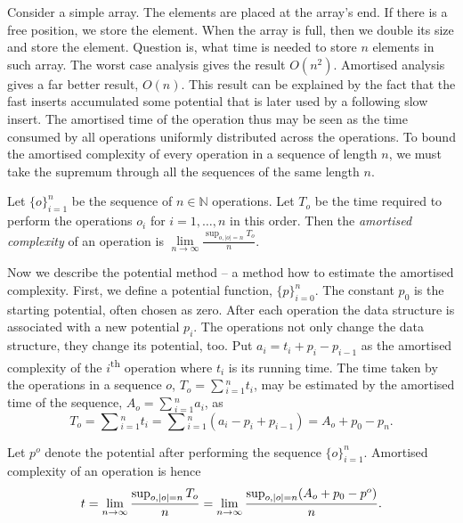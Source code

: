 Consider a simple array. The elements are placed at the array's end. If there is a free position, we store the element. When the array is full, then we double its size and store the element. Question is, what time is needed to store $n$ elements in such array. The worst case analysis gives the result $O(n ^ 2)$. Amortised analysis gives a far better result, $O(n)$. This result can be explained by the fact that the fast inserts accumulated some potential that is later used by a following slow insert. The amortised time of the operation thus may be seen as the time consumed by all operations uniformly distributed across the operations. To bound the amortised complexity of every operation in a sequence of length $n$, we must take the supremum through all the sequences of the same length $n$.
\begin{definition}
Let $\{o\}_{i = 1}^{n}$ be the sequence of $n \in \mathbb{N}$ operations. Let $T_o$ be the time required to perform the operations $o_i$ for $i = 1, \dots, n$ in this order. Then the \emph{amortised complexity} of an operation is $\lim\limits_{n \rightarrow \infty}\frac{\sup_{o, |o| = n}T_o}{n}$.
\end{definition}

Now we describe the potential method -- a method how to estimate the amortised complexity. First, we define a potential function, $\{p\}_{i = 0}^{n}$. The constant $p_0$ is the starting potential, often chosen as zero. After each operation the data structure is associated with a new potential $p_i$. The operations not only change the data structure, they change its potential, too. Put $a_i = t_i + p_{i} - p_{i - 1}$ as the amortised complexity of the $i$\textsuperscript{th} operation where $t_i$ is its running time. The time taken by the operations in a sequence $o$, $T_o = \sum\displaystyle_{i = 1}^{n} t_i$, may be estimated by the amortised time of the sequence, $A_o = \sum\displaystyle_{i = 1}^{n} a_i$, as
\[
	T_o = \sum\displaystyle_{i = 1}^{n} t_i = \sum\displaystyle_{i = 1}^{n} (a_i - p_i + p_{i - 1}) = A_o + p_0 - p_n \text{.}
\]

Let $p^o$ denote the potential after performing the sequence $\{o\}_{i = 1}^{n}$. Amortised complexity of an operation is hence
\[
	t = \lim\limits_{n \rightarrow \infty} \frac{\sup\displaylimits_{o, |o| = n} T_o}{n} = \lim\limits_{n \rightarrow \infty} \frac{\sup\displaylimits_{o, |o| = n} (A_o + p_0 - p^o)}{n} \text{.}
\]

